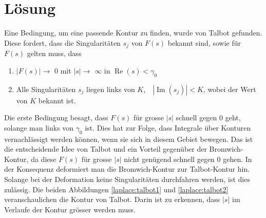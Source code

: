 %
%
%


\section{Lösung}
\label{laplace:section:Methode nach Talbot}
Eine Bedingung, um eine passende Kontur zu finden, wurde von Talbot gefunden.
%
Diese fordert, dass die Singularitäten $s_{j}$ von $F(s)$ bekannt sind, sowie für $F(s)$ gelten muss, dass
\begin{enumerate}
\item
$|F(s)|\rightarrow$ $0$ mit $|s|\rightarrow$ $\infty$ in
$\operatorname{Re}(s)<\gamma_{0}$
\item
Alle Singularitäten $s_{j}$ liegen links von
$K$,~~$|\operatorname{Im}(s_{j})|<K$, wobei der Wert von $K$ bekannt ist.
\end{enumerate}

Die erste Bedingung besagt, dass $F(s)$ für grosse $|s|$ schnell gegen $0$ geht, solange man links von $\gamma_{0}$ ist. Dies hat zur Folge, dass Integrale über Konturen vernachlässigt werden können, wenn sie sich in diesem Gebiet bewegen. Das ist die entscheidende Idee von Talbot und ein Vorteil gegenüber der Bromwich-Kontur, da diese $F(s)$ für grosse $|s|$ nicht genügend schnell gegen $0$ gehen. In der Konsequenz deformiert man die Bromwich-Kontur zur Talbot-Kontur hin.
Solange bei der Deformation keine Singularitäten durchfahren werden,
ist dies zulässig.
Die beiden Abbildungen \ref{laplace:talbot1} und \ref{laplace:talbot2} veranschaulichen die Kontur von Talbot.
%
%
Darin ist zu erkennen, dass $|s|$ im Verlaufe der Kontur grösser werden muss. 

